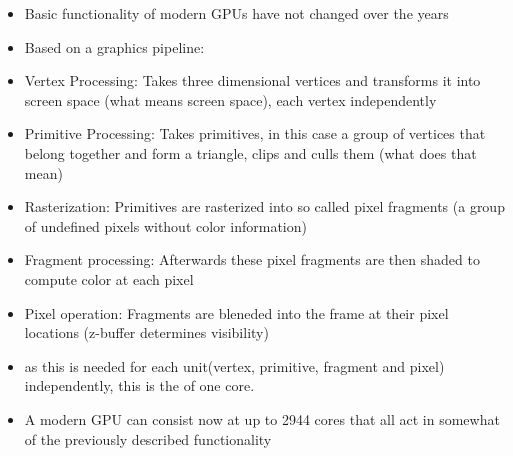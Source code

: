 \begin{itemize}
	\item Basic functionality of modern GPUs \cite{kilgariff2005geforce} have not changed over the years \cite{nvidia2018turing}
	\item Based on a graphics pipeline:
	\item Vertex Processing: Takes  three dimensional vertices and transforms it into screen space (what means screen space), each vertex independently
	\item Primitive Processing: Takes primitives, in this case a group of vertices that belong together and form a triangle, clips and culls them (what does that mean)
	\item Rasterization: Primitives are rasterized into so called pixel fragments (a group of undefined pixels without color information)
	\item Fragment processing: Afterwards these pixel fragments are then shaded to compute color at each pixel
	\item Pixel operation: Fragments are bleneded into the frame at their pixel locations (z-buffer determines visibility)
	\item as this is needed for each unit(vertex, primitive, fragment and pixel) independently, this is the of one core.
	\item A modern GPU can consist now at up to 2944 cores that all act in somewhat of the previously described functionality
\end{itemize}

